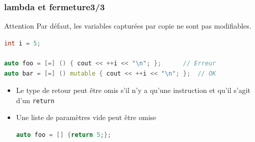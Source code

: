 \documentclass[C++.tex]{subfiles}
\begin{document}
\begin{frame}[fragile]
	\frametitle{lambda et fermeture\titlehfill{}3/3}
	\begin{alertblock}{Attention}
		Par défaut, les variables capturées par copie ne sont pas modifiables.

		\begin{lstlisting}[language=C++]
int i = 5;

auto foo = [=] () { cout << ++i << "\n"; };      // Erreur
auto bar = [=] () mutable { cout << ++i << "\n"; };  // OK\end{lstlisting}

	\end{alertblock}

	\begin{itemize}
		\item Le type de retour peut être omis s'il n'y a qu'une instruction et qu'il s'agit d'un \lstinline|return|
	
	
		\item Une liste de paramètres vide peut être omise


\begin{lstlisting}[language=C++]
auto foo = [] {return 5;};\end{lstlisting}
	\end{itemize}
\end{frame}
\end{document}
